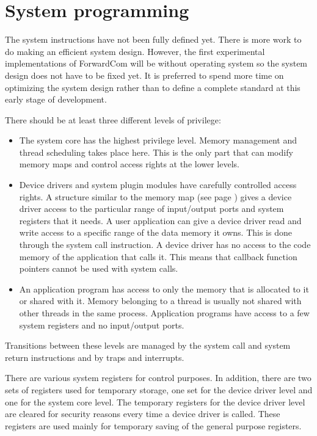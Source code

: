 \documentclass[forwardcom.tex]{subfiles}
\begin{document}
\RaggedRight


\chapter{System programming}

The system instructions have not been fully defined yet. There is more work to do making an efficient system design. However, the first experimental implementations of ForwardCom will be without operating system so the system design does not have to be fixed yet. It is preferred to spend more time on optimizing the system design rather than to define a complete standard at this early stage of development.
\vspace{2mm}

There should be at least three different levels of privilege:
\begin{itemize}
\item The system core has the highest privilege level. Memory management and thread scheduling takes place here. This is the only part that can modify memory maps and control access rights at the lower levels.

\item Device drivers and system plugin modules have carefully controlled access rights. A structure similar to the memory map (see page \pageref{memoryManagement}) gives a device driver access to the particular range of input/output ports and system registers that it needs. A user application can give a device driver read and write access to a specific range of the data memory it owns. This is done through the system call instruction. A device driver has no access to the code memory of the application that calls it. This means that callback function pointers cannot be used with system calls.

\item An application program has access to only the memory that is allocated to it or shared with it. Memory belonging to a thread is usually not shared with other threads in the same process. Application programs have access to a few system registers and no input/output ports.

\end{itemize}

Transitions between these levels are managed by the system call and system return instructions and by traps and interrupts.
\vspace{2mm}

There are various system registers for control purposes. In addition, there are two sets of registers used for temporary storage, one set for the device driver level and one for the system core level. The temporary registers for the device driver level are cleared for security reasons every time a device driver is called. These registers are used mainly for temporary saving of the general purpose registers.
\end{document}
